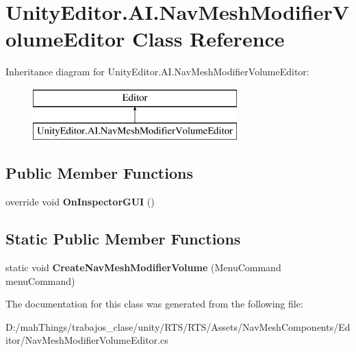 \hypertarget{class_unity_editor_1_1_a_i_1_1_nav_mesh_modifier_volume_editor}{}\section{Unity\+Editor.\+A\+I.\+Nav\+Mesh\+Modifier\+Volume\+Editor Class Reference}
\label{class_unity_editor_1_1_a_i_1_1_nav_mesh_modifier_volume_editor}
Inheritance diagram for Unity\+Editor.\+A\+I.\+Nav\+Mesh\+Modifier\+Volume\+Editor\+:\begin{figure}[H]
\begin{center}
\leavevmode
\includegraphics[height=2.000000cm]{class_unity_editor_1_1_a_i_1_1_nav_mesh_modifier_volume_editor}
\end{center}
\end{figure}
\subsection*{Public Member Functions}
\begin{DoxyCompactItemize}
\item 
\mbox{\label{class_unity_editor_1_1_a_i_1_1_nav_mesh_modifier_volume_editor_a1691fedc7d5772f04c10ac7cd60e98e5}} 
override void {\bfseries On\+Inspector\+G\+UI} ()
\end{DoxyCompactItemize}
\subsection*{Static Public Member Functions}
\begin{DoxyCompactItemize}
\item 
\mbox{\label{class_unity_editor_1_1_a_i_1_1_nav_mesh_modifier_volume_editor_ae11cb0e71942b612c58cb0a495035b80}} 
static void {\bfseries Create\+Nav\+Mesh\+Modifier\+Volume} (Menu\+Command menu\+Command)
\end{DoxyCompactItemize}


The documentation for this class was generated from the following file\+:\begin{DoxyCompactItemize}
\item 
D\+:/mah\+Things/trabajos\+\_\+clase/unity/\+R\+T\+S/\+R\+T\+S/\+Assets/\+Nav\+Mesh\+Components/\+Editor/Nav\+Mesh\+Modifier\+Volume\+Editor.\+cs\end{DoxyCompactItemize}
